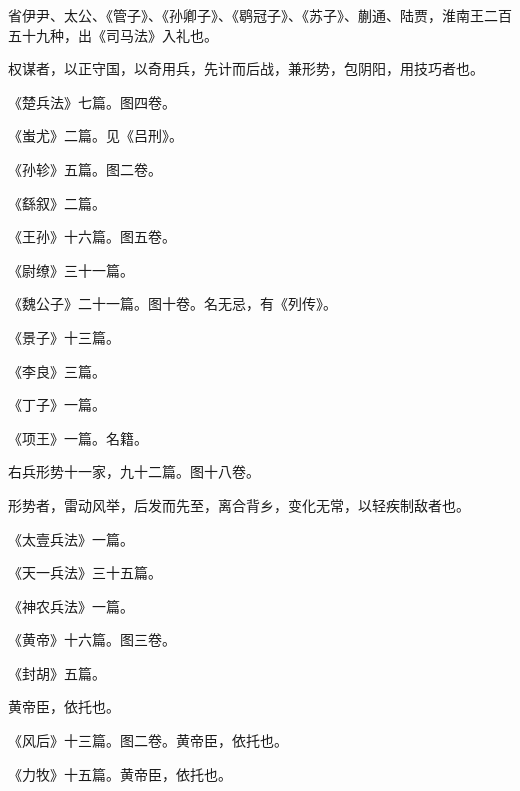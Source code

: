 \documentclass[12pt,UTF8]{ctexbook}
\begin{document}
省伊尹、太公、《管子》、《孙卿子》、《鹖冠子》、《苏子》、蒯通、陆贾，淮南王二百五十九种，出《司马法》入礼也。



权谋者，以正守国，以奇用兵，先计而后战，兼形势，包阴阳，用技巧者也。



《楚兵法》七篇。图四卷。



《蚩尤》二篇。见《吕刑》。



《孙轸》五篇。图二卷。



《繇叙》二篇。



《王孙》十六篇。图五卷。



《尉缭》三十一篇。



《魏公子》二十一篇。图十卷。名无忌，有《列传》。



《景子》十三篇。



《李良》三篇。



《丁子》一篇。



《项王》一篇。名籍。



右兵形势十一家，九十二篇。图十八卷。



形势者，雷动风举，后发而先至，离合背乡，变化无常，以轻疾制敌者也。



《太壹兵法》一篇。



《天一兵法》三十五篇。



《神农兵法》一篇。



《黄帝》十六篇。图三卷。



《封胡》五篇。



黄帝臣，依托也。



《风后》十三篇。图二卷。黄帝臣，依托也。



《力牧》十五篇。黄帝臣，依托也。
\end{document}
